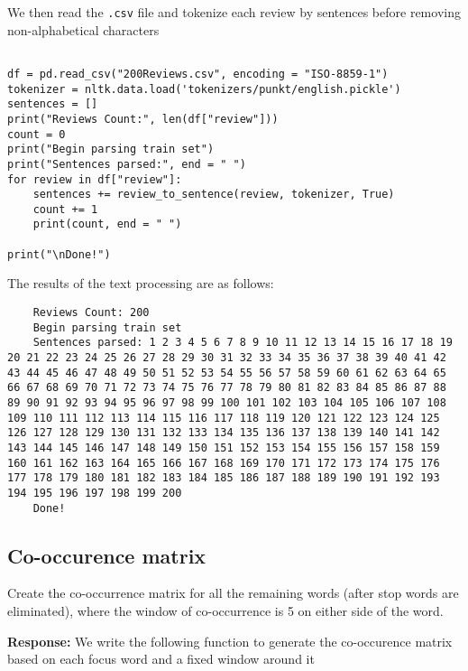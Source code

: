 \documentclass[12pt, letterpaper]{article}
\newcommand{\mybox}[1]{\par\noindent\colorbox{shadecolor}
{\parbox{\dimexpr\textwidth-2\fboxsep\relax}{#1}}}
\begin{document}
We then read the \texttt{.csv} file and tokenize each review by sentences before removing non-alphabetical characters

\begin{mdframed}[backgroundcolor=shadecolor]
\begin{verbatim}

df = pd.read_csv("200Reviews.csv", encoding = "ISO-8859-1")
tokenizer = nltk.data.load('tokenizers/punkt/english.pickle')
sentences = []
print("Reviews Count:", len(df["review"]))
count = 0
print("Begin parsing train set")
print("Sentences parsed:", end = " ")
for review in df["review"]:
    sentences += review_to_sentence(review, tokenizer, True)
    count += 1
    print(count, end = " ")
    
print("\nDone!")

\end{verbatim}
\end{mdframed}

The results of the text processing are as follows:

\begin{lstlisting}
    Reviews Count: 200
    Begin parsing train set
    Sentences parsed: 1 2 3 4 5 6 7 8 9 10 11 12 13 14 15 16 17 18 19 20 21 22 23 24 25 26 27 28 29 30 31 32 33 34 35 36 37 38 39 40 41 42 43 44 45 46 47 48 49 50 51 52 53 54 55 56 57 58 59 60 61 62 63 64 65 66 67 68 69 70 71 72 73 74 75 76 77 78 79 80 81 82 83 84 85 86 87 88 89 90 91 92 93 94 95 96 97 98 99 100 101 102 103 104 105 106 107 108 109 110 111 112 113 114 115 116 117 118 119 120 121 122 123 124 125 126 127 128 129 130 131 132 133 134 135 136 137 138 139 140 141 142 143 144 145 146 147 148 149 150 151 152 153 154 155 156 157 158 159 160 161 162 163 164 165 166 167 168 169 170 171 172 173 174 175 176 177 178 179 180 181 182 183 184 185 186 187 188 189 190 191 192 193 194 195 196 197 198 199 200 
    Done!
\end{lstlisting}

\subsection{Co-occurence matrix}
\mybox{Create the co-occurrence matrix for all the remaining words (after stop words are eliminated), where the window of co-occurrence is 5 on either side of the word.}

\textbf{Response:} We write the following function to generate the co-occurence matrix based on each focus word and a fixed window around it
\end{document}
